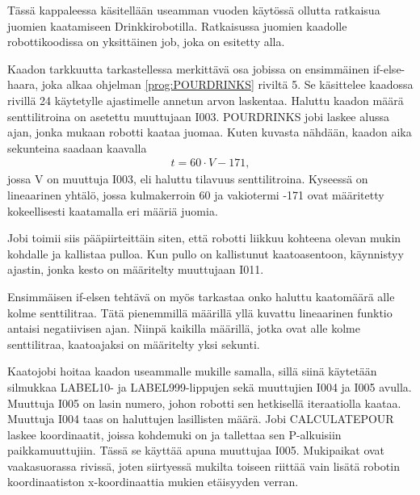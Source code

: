 Tässä kappaleessa käsitellään useamman vuoden käytössä ollutta ratkaisua juomien kaatamiseen Drinkkirobotilla. Ratkaisussa juomien kaadolle robottikoodissa on yksittäinen job, joka on esitetty alla.


%

\lstset{style=Yaskawatyyli}


Kaadon tarkkuutta tarkastellessa merkittävä osa jobissa on ensimmäinen if-else-haara, joka alkaa ohjelman \ref{prog:POURDRINKS} riviltä 5. Se käsittelee kaadossa rivillä 24 käytetylle ajastimelle annetun arvon laskentaa. Haluttu kaadon määrä senttilitroina on asetettu muuttujaan I003. POURDRINKS jobi laskee alussa ajan, jonka mukaan robotti kaataa juomaa. Kuten kuvasta nähdään, kaadon aika sekunteina saadaan kaavalla
\begin{align}
   t = 60 \cdot V - 171 \mathrm{,}
\end{align}
jossa V on muuttuja I003, eli haluttu tilavuus senttilitroina. Kyseessä on lineaarinen yhtälö, jossa kulmakerroin 60 ja vakiotermi -171 ovat määritetty kokeellisesti kaatamalla eri määriä juomia.

Jobi toimii siis pääpiirteittäin siten, että robotti liikkuu kohteena olevan mukin kohdalle ja kallistaa pulloa. Kun pullo on kallistunut kaatoasentoon, käynnistyy ajastin, jonka kesto on määritelty muuttujaan I011.

Ensimmäisen if-elsen tehtävä on myös tarkastaa onko haluttu kaatomäärä alle kolme senttilitraa. Tätä pienemmillä määrillä yllä kuvattu lineaarinen funktio antaisi negatiivisen ajan. Niinpä kaikilla määrillä, jotka ovat alle kolme senttilitraa, kaatoajaksi on määritelty yksi sekunti.

Kaatojobi hoitaa kaadon useammalle mukille samalla, sillä siinä käytetään silmukkaa LABEL10- ja LABEL999-lippujen sekä muuttujien I004 ja I005 avulla. Muuttuja I005 on lasin numero, johon robotti sen hetkisellä iteraatiolla kaataa. Muuttuja I004 taas on haluttujen lasillisten määrä. Jobi CALCULATEPOUR laskee koordinaatit, joissa kohdemuki on ja tallettaa sen P-alkuisiin paikkamuuttujiin. Tässä se käyttää apuna muuttujaa I005. Mukipaikat ovat vaakasuorassa rivissä, joten siirtyessä mukilta toiseen riittää vain lisätä robotin koordinaatiston x-koordinaattia mukien etäisyyden verran.
